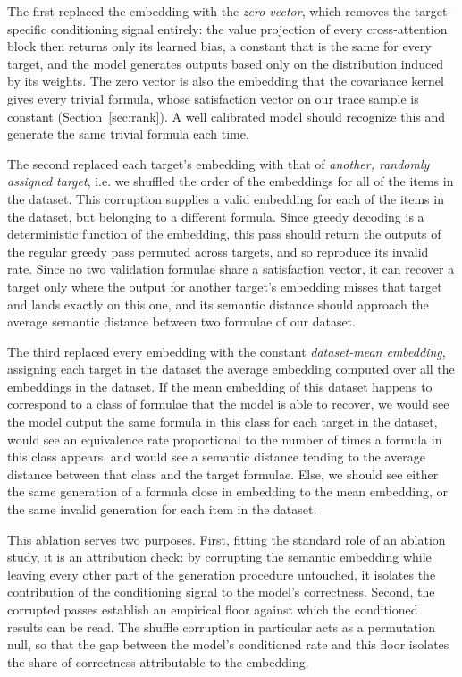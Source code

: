 \documentclass[titlepage,a4paper,11pt]{report}
\DeclareRobustCommand{\RSnew}[1]{{\color{blue!65!black}#1}}
\begin{document}
    The first replaced the embedding with the \emph{zero vector}, which removes the target-specific conditioning signal entirely: the value projection of every cross-attention block then returns only its learned bias, a constant that is the same for every target, and the model generates outputs based only on the distribution induced by its weights. The zero vector is also the embedding that the covariance kernel gives every trivial formula, whose satisfaction vector on our trace sample is constant (Section~\ref{sec:rank}). A well calibrated model should recognize this and generate the same trivial formula each time.
    
    The second replaced each target's embedding with that of \emph{another, randomly assigned target}, i.e. we shuffled the order of the embeddings for all of the items in the dataset. This corruption supplies a valid embedding for each of the items in the dataset, but belonging to a different formula. Since greedy decoding is a deterministic function of the embedding, this pass should return the outputs of the regular greedy pass permuted across targets, and so reproduce its invalid rate. Since no two validation formulae share a satisfaction vector, it can recover a target only where the output for another target's embedding misses that target and lands exactly on this one, and its semantic distance should approach the average semantic distance between two formulae of our dataset. 
    
    The third replaced every embedding with the constant \emph{dataset-mean embedding}, assigning each target in the dataset the average embedding computed over all the embeddings in the dataset. If the mean embedding of this dataset happens to correspond to a class of formulae that the model is able to recover, we would see the model output the same formula in this class for each target in the dataset, would see an equivalence rate proportional to the number of times a formula in this class appears, and would see a semantic distance tending to the average distance between that class and the target formulae. Else, we should see either the same generation of a formula close in embedding to the mean embedding, or the same invalid generation for each item in the dataset.

    
    \RSnew{This ablation} serves two purposes. First, fitting the standard role of an ablation study, it is an attribution check: by corrupting the semantic embedding while leaving every other part of the generation procedure untouched, it isolates the contribution of the conditioning signal to the model's correctness. Second, the corrupted passes establish an empirical floor against which the conditioned results can be read. The shuffle corruption in particular acts as a permutation null, so that the gap between the model's conditioned rate and this floor isolates the share of correctness attributable to the embedding.
\end{document}
